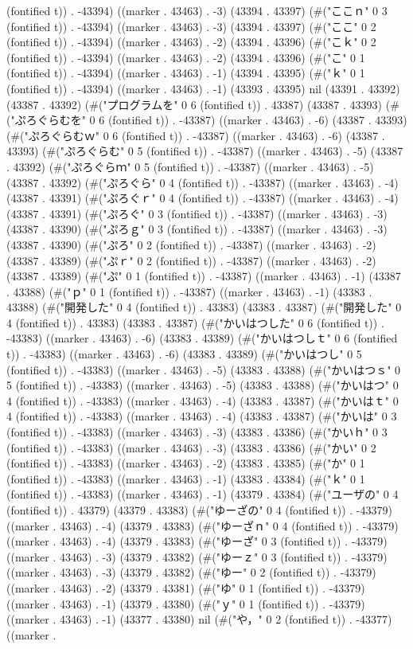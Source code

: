 (fontified t)) . -43394) ((marker . 43463) . -3) (43394 . 43397) (#("ここｎ" 0 3 (fontified t)) . -43394) ((marker . 43463) . -3) (43394 . 43397) (#("ここ" 0 2 (fontified t)) . -43394) ((marker . 43463) . -2) (43394 . 43396) (#("こｋ" 0 2 (fontified t)) . -43394) ((marker . 43463) . -2) (43394 . 43396) (#("こ" 0 1 (fontified t)) . -43394) ((marker . 43463) . -1) (43394 . 43395) (#("ｋ" 0 1 (fontified t)) . -43394) ((marker . 43463) . -1) (43393 . 43395) nil (43391 . 43392) (43387 . 43392) (#("プログラムを" 0 6 (fontified t)) . 43387) (43387 . 43393) (#("ぷろぐらむを" 0 6 (fontified t)) . -43387) ((marker . 43463) . -6) (43387 . 43393) (#("ぷろぐらむｗ" 0 6 (fontified t)) . -43387) ((marker . 43463) . -6) (43387 . 43393) (#("ぷろぐらむ" 0 5 (fontified t)) . -43387) ((marker . 43463) . -5) (43387 . 43392) (#("ぷろぐらｍ" 0 5 (fontified t)) . -43387) ((marker . 43463) . -5) (43387 . 43392) (#("ぷろぐら" 0 4 (fontified t)) . -43387) ((marker . 43463) . -4) (43387 . 43391) (#("ぷろぐｒ" 0 4 (fontified t)) . -43387) ((marker . 43463) . -4) (43387 . 43391) (#("ぷろぐ" 0 3 (fontified t)) . -43387) ((marker . 43463) . -3) (43387 . 43390) (#("ぷろｇ" 0 3 (fontified t)) . -43387) ((marker . 43463) . -3) (43387 . 43390) (#("ぷろ" 0 2 (fontified t)) . -43387) ((marker . 43463) . -2) (43387 . 43389) (#("ぷｒ" 0 2 (fontified t)) . -43387) ((marker . 43463) . -2) (43387 . 43389) (#("ぷ" 0 1 (fontified t)) . -43387) ((marker . 43463) . -1) (43387 . 43388) (#("ｐ" 0 1 (fontified t)) . -43387) ((marker . 43463) . -1) (43383 . 43388) (#("開発した" 0 4 (fontified t)) . 43383) (43383 . 43387) (#("開発した" 0 4 (fontified t)) . 43383) (43383 . 43387) (#("かいはつした" 0 6 (fontified t)) . -43383) ((marker . 43463) . -6) (43383 . 43389) (#("かいはつしｔ" 0 6 (fontified t)) . -43383) ((marker . 43463) . -6) (43383 . 43389) (#("かいはつし" 0 5 (fontified t)) . -43383) ((marker . 43463) . -5) (43383 . 43388) (#("かいはつｓ" 0 5 (fontified t)) . -43383) ((marker . 43463) . -5) (43383 . 43388) (#("かいはつ" 0 4 (fontified t)) . -43383) ((marker . 43463) . -4) (43383 . 43387) (#("かいはｔ" 0 4 (fontified t)) . -43383) ((marker . 43463) . -4) (43383 . 43387) (#("かいは" 0 3 (fontified t)) . -43383) ((marker . 43463) . -3) (43383 . 43386) (#("かいｈ" 0 3 (fontified t)) . -43383) ((marker . 43463) . -3) (43383 . 43386) (#("かい" 0 2 (fontified t)) . -43383) ((marker . 43463) . -2) (43383 . 43385) (#("か" 0 1 (fontified t)) . -43383) ((marker . 43463) . -1) (43383 . 43384) (#("ｋ" 0 1 (fontified t)) . -43383) ((marker . 43463) . -1) (43379 . 43384) (#("ユーザの" 0 4 (fontified t)) . 43379) (43379 . 43383) (#("ゆーざの" 0 4 (fontified t)) . -43379) ((marker . 43463) . -4) (43379 . 43383) (#("ゆーざｎ" 0 4 (fontified t)) . -43379) ((marker . 43463) . -4) (43379 . 43383) (#("ゆーざ" 0 3 (fontified t)) . -43379) ((marker . 43463) . -3) (43379 . 43382) (#("ゆーｚ" 0 3 (fontified t)) . -43379) ((marker . 43463) . -3) (43379 . 43382) (#("ゆー" 0 2 (fontified t)) . -43379) ((marker . 43463) . -2) (43379 . 43381) (#("ゆ" 0 1 (fontified t)) . -43379) ((marker . 43463) . -1) (43379 . 43380) (#("ｙ" 0 1 (fontified t)) . -43379) ((marker . 43463) . -1) (43377 . 43380) nil (#("や，" 0 2 (fontified t)) . -43377) ((marker . 